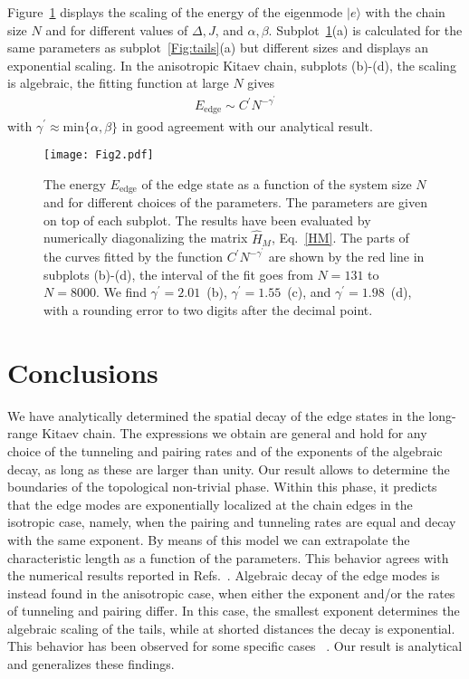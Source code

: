 \documentclass[pra,twocolumn,
superscriptaddress,
showpacs,
aps
]{revtex4-1}
\begin{document}
Figure~\ref{Fig:energy} displays the scaling of the energy of the eigenmode $|e\rangle$ with the chain size $N$ and for different values of $\Delta,J$, and $\alpha,\beta$. Subplot~\ref{Fig:energy}(a) is calculated for the same parameters as subplot~\ref{Fig:tails}(a) but different sizes and displays an exponential scaling. In the anisotropic Kitaev chain, subplots (b)-(d), the scaling is algebraic, the fitting function at large $N$ gives 
\begin{align}
E_{\mathrm{edge}} \sim C^{\prime}N^{-\gamma^{\prime}}\label{Fitenergy}
\end{align}
with $\gamma^{\prime}\approx\mathrm{min}\{\alpha,\beta\}$ in good agreement with our analytical result.

\begin{figure}[ht]
	\center \texttt{[image: Fig2.pdf]}
	\caption{The energy $E_{\mathrm{edge}}$ of the edge state as a function of the system size $N$ and for different choices of the parameters. The parameters are given on top of each subplot. The results have been evaluated by numerically diagonalizing the matrix $\hat H_M$, Eq.~\eqref{HM}. The parts of the curves fitted by the function $C^{\prime}N^{-\gamma^{\prime}}$ are shown by the red line in subplots (b)-(d), the interval of the fit goes from $N=131$ to $N=8000$. We find $\gamma^{\prime}=2.01$~(b), $\gamma^{\prime}=1.55$~(c), and $\gamma^{\prime}=1.98$~(d), with a rounding error to two digits after the decimal point.\label{Fig:energy}}
\end{figure}

\section{Conclusions}
\label{sec:conclusions}

We have analytically determined the spatial decay of the edge states in the long-range Kitaev chain. The expressions we obtain are general and hold for any choice of the tunneling and pairing rates and of the exponents of the algebraic decay, as long as these are larger than unity. Our result allows to determine the boundaries of the topological non-trivial phase. Within this phase, it predicts that the edge modes are exponentially localized at the chain edges in the isotropic case, namely, when the pairing and tunneling rates are equal and decay with the same exponent. By means of this model we can extrapolate the characteristic length as a function of the parameters. This behavior agrees with the numerical results reported in Refs.~\cite{Vodola2014,Vodola2016}. Algebraic decay of the edge modes is instead found in the anisotropic case, when either the exponent and/or the rates of tunneling and pairing differ. In this case, the smallest exponent determines the algebraic scaling of the tails, while at shorted distances the decay is exponential. This behavior has been observed for some specific cases ~\cite{Vodola2014,Vodola2016,Alecce2017}. Our result is analytical and generalizes these findings.  
\end{document}
